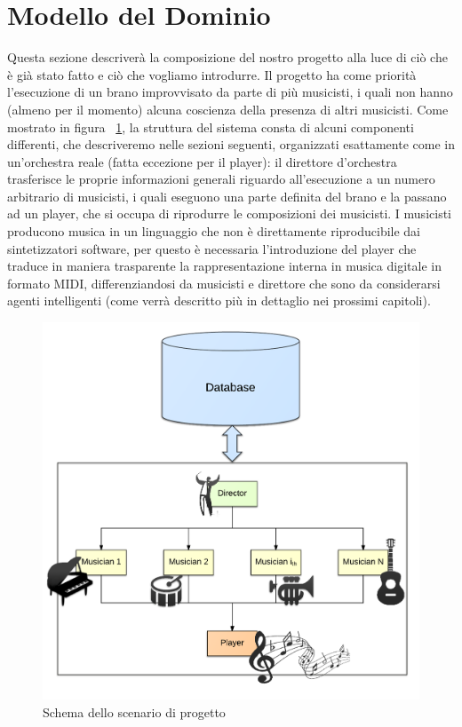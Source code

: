 \section{Modello del Dominio}

Questa sezione descriverà la composizione del nostro progetto alla luce di ciò che è già stato fatto e ciò che vogliamo introdurre.
Il progetto ha come priorità l'esecuzione di un brano improvvisato da parte di più musicisti, i quali non hanno (almeno per il momento) alcuna coscienza della presenza di altri musicisti.
Come mostrato in figura ~\ref{fig:dom}, la struttura del sistema consta di alcuni componenti differenti, che descriveremo nelle sezioni seguenti, organizzati esattamente come in un'orchestra reale (fatta eccezione per il player):
il direttore d'orchestra trasferisce le proprie informazioni generali riguardo all'esecuzione a un numero arbitrario di musicisti, i quali eseguono una parte definita del brano e la passano ad un player, che si occupa di riprodurre le composizioni dei musicisti.
I musicisti producono musica in un linguaggio che non è direttamente riproducibile dai sintetizzatori software, per questo è necessaria l'introduzione del player che traduce in maniera trasparente la rappresentazione interna in musica digitale in formato MIDI, differenziandosi da musicisti e direttore che sono da considerarsi agenti intelligenti (come verrà descritto più in dettaglio nei prossimi capitoli).

\begin{figure}[H]
\centering
\includegraphics[scale=0.30]{img/model.png}
\caption{Schema dello scenario di progetto}
\label{fig:dom}
\end{figure}

